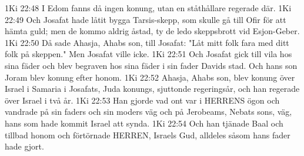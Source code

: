 1Ki 22:48  I Edom fanns då ingen konung, utan en ståthållare regerade där.
1Ki 22:49  Och Josafat hade låtit bygga Tarsis-skepp, som skulle gå till Ofir för att hämta guld; men de kommo aldrig åstad, ty de ledo skeppsbrott vid Esjon-Geber.
1Ki 22:50  Då sade Ahasja, Ahabs son, till Josafat: "Låt mitt folk fara med ditt folk på skeppen." Men Josafat ville icke.
1Ki 22:51  Och Josafat gick till vila hos sina fäder och blev begraven hos sina fäder i sin fader Davids stad. Och hans son Joram blev konung efter honom.
1Ki 22:52  Ahasja, Ahabs son, blev konung över Israel i Samaria i Josafats, Juda konungs, sjuttonde regeringsår, och han regerade över Israel i två år.
1Ki 22:53  Han gjorde vad ont var i HERRENS ögon och vandrade på sin faders och sin moders väg och på Jerobeams, Nebats sons, väg, hans som hade kommit Israel att synda.
1Ki 22:54  Och han tjänade Baal och tillbad honom och förtörnade HERREN, Israels Gud, alldeles såsom hans fader hade gjort.


